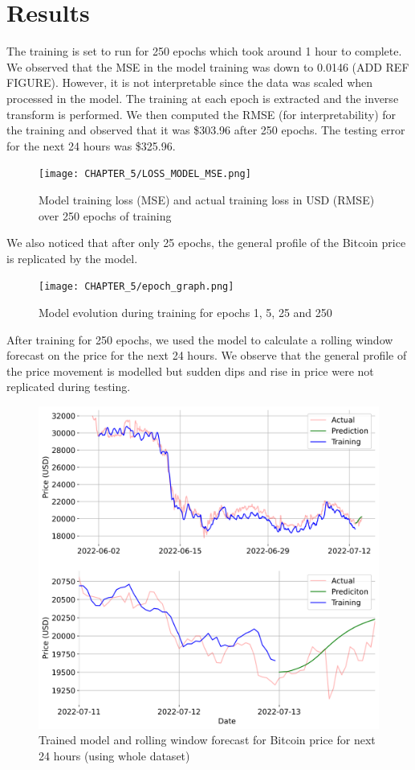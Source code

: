 \section{Results}
The training is set to run for 250 epochs which took around 1 hour to complete. We observed that the MSE in the model training was down to 0.0146 (ADD REF FIGURE). However, it is not interpretable since the data was scaled when processed in the model. The training at each epoch is extracted and the inverse transform is performed. We then computed the RMSE (for interpretability) for the training and observed that it was \$303.96 after 250 epochs. The testing error for the next 24 hours was \$325.96.  
\begin{figure}[H]
   \centering
   \texttt{[image: CHAPTER\_5/LOSS\_MODEL\_MSE.png]}
   \caption{Model training loss (MSE) and actual training loss in USD (RMSE) over 250 epochs of training}
   \label{training_loss}
\end{figure}
\noindent We also noticed that after only 25 epochs, the general profile of the Bitcoin price is replicated by the model.
 \begin{figure}[H]
    \centering
    \texttt{[image: CHAPTER\_5/epoch\_graph.png]}
    \caption{Model evolution during training for epochs 1, 5, 25 and 250}
    \label{epoch_graph}
 \end{figure}
\noindent After training for 250 epochs, we used the model to calculate a rolling window forecast on the price for the next 24 hours. We observe that the general profile of the price movement is modelled but sudden dips and rise in price were not replicated during testing.
\begin{figure}[H]
   \centering
   \includegraphics[scale=0.55]{CHAPTER_5/result_pred.png}
   \caption{Trained model and rolling window forecast for Bitcoin price for next 24 hours (using whole dataset)}
   \label{result_pred}
\end{figure}
